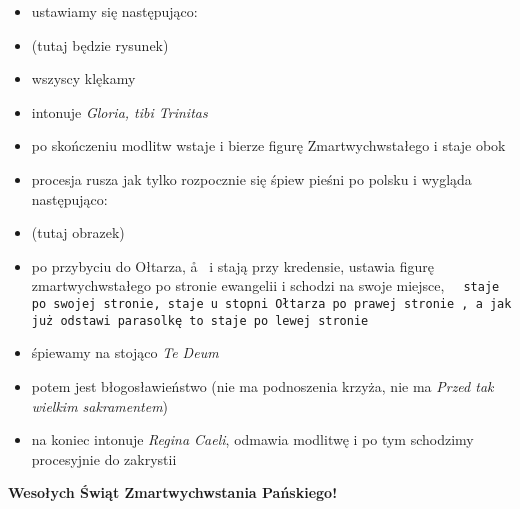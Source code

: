 \begin{itemize}
	\item ustawiamy się następująco:
	\item (tutaj będzie rysunek)
	\item wszyscy klękamy
	\item \ii intonuje \textit{Gloria, tibi Trinitas}
	\item po skończeniu modlitw  wstaje i bierze figurę Zmartwychwstałego i staje obok 
	\item procesja rusza jak tylko rozpocznie się śpiew pieśni po polsku i
	      wygląda następująco:
	\item (tutaj obrazek)
	\item po przybyciu do Ołtarza, \aa~ i  stają przy kredensie, 
	      ustawia figurę zmartwychwstałego po stronie ewangelii i schodzi na
	      swoje miejsce, \tt~ staje po swojej stronie,  staje u stopni
	      Ołtarza po prawej stronie \ii, a  jak już odstawi parasolkę to
	      staje po lewej stronie \ii
	\item śpiewamy na stojąco \textit{Te Deum}
	\item potem jest błogosławieństwo (nie ma podnoszenia krzyża, nie ma
	      \textit{Przed tak wielkim sakramentem})
	\item na koniec \ii intonuje \textit{Regina Caeli}, odmawia modlitwę i po
	      tym schodzimy procesyjnie do zakrystii
\end{itemize}

\bigskip

\begin{center}
	\Large
	\textbf{Wesołych Świąt Zmartwychwstania Pańskiego!}
\end{center}